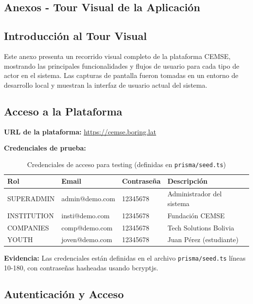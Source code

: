 \documentclass[12pt,a4paper]{article}
\begin{document}
\begin{enumerate}
\section{Anexos - Tour Visual de la Aplicación}

\subsection{Introducción al Tour Visual}

Este anexo presenta un recorrido visual completo de la plataforma CEMSE, mostrando las principales funcionalidades y flujos de usuario para cada tipo de actor en el sistema. Las capturas de pantalla fueron tomadas en un entorno de desarrollo local y muestran la interfaz de usuario actual del sistema.

\subsection{Acceso a la Plataforma}

\textbf{URL de la plataforma:} \url{https://cemse.boring.lat}

\textbf{Credenciales de prueba:}

\begin{table}[H]
\centering
\begin{tabular}{|l|l|l|l|}
\hline
\textbf{Rol} & \textbf{Email} & \textbf{Contraseña} & \textbf{Descripción} \\
\hline
SUPERADMIN & admin@demo.com & 12345678 & Administrador del sistema \\
\hline
INSTITUTION & insti@demo.com & 12345678 & Fundación CEMSE \\
\hline
COMPANIES & comp@demo.com & 12345678 & Tech Solutions Bolivia \\
\hline
YOUTH & joven@demo.com & 12345678 & Juan Pérez (estudiante) \\
\hline
\end{tabular}
\caption{Credenciales de acceso para testing (definidas en \texttt{prisma/seed.ts})}
\label{tab:credentials}
\end{table}

\textbf{Evidencia:} Las credenciales están definidas en el archivo \texttt{prisma/seed.ts} líneas 10-180, con contraseñas hasheadas usando bcryptjs.

\subsection{Autenticación y Acceso}


\end{enumerate}
\end{document}
